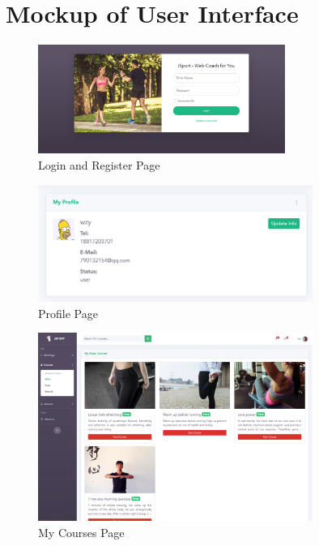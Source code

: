 \documentclass[16pt]{scrreprt}
\begin{document}
\section{Mockup of User Interface}
\begin{figure}[H]
	\centering
	\includegraphics[width=0.72\textwidth]{diagrams/login_register.png}
	\caption{Login and Register Page}
\end{figure}

\begin{figure}[H]
	\centering
	\includegraphics[width=0.8\textwidth]{diagrams/profile.png}
	\caption{Profile Page}
\end{figure}

\begin{figure}[H]
	\centering
	\includegraphics[width=0.8\textwidth]{diagrams/mine.png}
	\caption{My Courses Page}
\end{figure}
\end{document}
